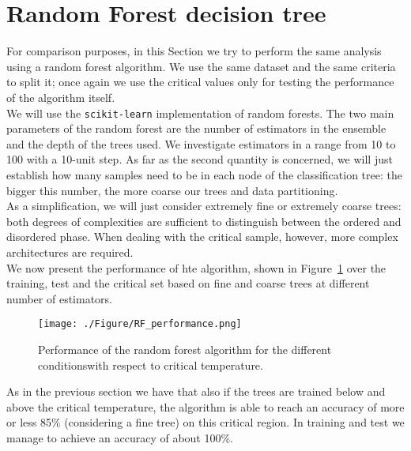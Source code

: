 \documentclass[a4paper,11pt]{article}
\begin{document}
\section{Random Forest decision tree}
For comparison purposes, in this Section we try to perform the same analysis using a random forest algorithm. We use the same dataset and the same criteria to split it; once again we use the critical values only for testing the performance of the algorithm itself. 
\\
We will use the \texttt{scikit-learn} implementation of random forests. The two main parameters of the random forest are the number of estimators in the ensemble and the depth of the trees used. We investigate estimators in a range from 10 to 100 with a 10-unit step.
As far as the second quantity is concerned, we will just establish how many samples need to be in each node of the classification tree: the bigger this number, the more coarse our trees and data partitioning.
\\
As a simplification, we will just consider extremely fine or extremely coarse trees: both degrees of complexities are sufficient to distinguish between the ordered and disordered phase. When dealing with the critical sample, however, more complex architectures are required.
\\
We now present the performance of hte algorithm, shown in Figure~\ref{fig:RF_P} over the training, test and the critical set based on fine and coarse trees at different number of estimators.

\begin{figure}[htp]
    \centering
    \texttt{[image: ./Figure/RF\_performance.png]}
    \caption{Performance of the random forest algorithm for the different conditions\footnotemark with respect to critical temperature.}
    \label{fig:RF_P}
\end{figure}


As in the previous section we have that also if the trees are trained below and above the critical temperature, the algorithm is able to reach an accuracy of more or less 85\% (considering a fine tree) on this critical region. 
In training and test we manage to achieve an accuracy of about 100\%. 
\end{document}

